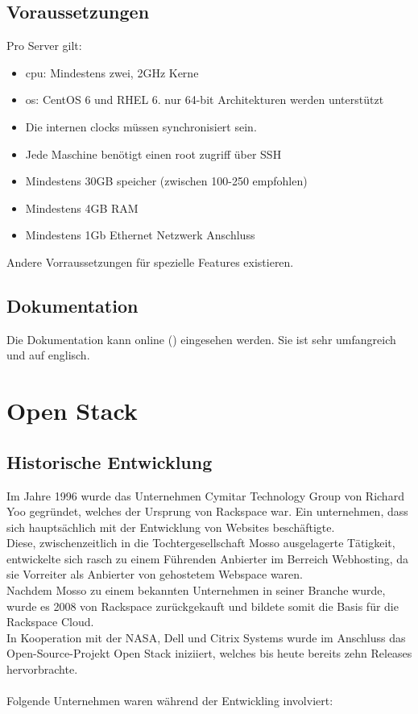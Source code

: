 \documentclass[a4paper,nochapterprefix,english,12pt]{scrreprt}
\begin{document}
\section{Voraussetzungen}
Pro Server gilt:
\begin{itemize}
\item \gls{cpu}: Mindestens zwei, 2GHz Kerne
\item \gls{os}:  CentOS 6 und RHEL 6. nur 64-bit Architekturen werden unterstützt
\item Die internen clocks müssen synchronisiert sein.
\item Jede Maschine benötigt einen root zugriff über SSH
\item Mindestens 30GB speicher (zwischen 100-250 empfohlen)
\item Mindestens 4GB RAM
\item Mindestens 1Gb Ethernet Netzwerk Anschluss
\end{itemize}
Andere Vorraussetzungen für spezielle Features existieren. \cite{EucalyptusRequ}
\section{Dokumentation}
Die Dokumentation kann online (\cite{EucalyptusDoc}) eingesehen werden.
Sie ist sehr umfangreich und auf englisch.


\chapter{Open Stack} \thispagestyle{fancy}
\section{Historische Entwicklung}
Im Jahre 1996 wurde das Unternehmen Cymitar Technology Group von Richard Yoo gegründet, welches der Ursprung von Rackspace war.
Ein unternehmen, dass sich hauptsächlich mit der Entwicklung von Websites beschäftigte.\\
Diese, zwischenzeitlich in die Tochtergesellschaft Mosso ausgelagerte Tätigkeit, entwickelte sich rasch zu einem Führenden Anbierter im Berreich Webhosting, da sie Vorreiter als Anbierter von gehostetem Webspace waren.\\
Nachdem Mosso zu einem bekannten Unternehmen in seiner Branche wurde, wurde es 2008 von Rackspace zurückgekauft und bildete somit die Basis für die Rackspace Cloud.\\
In Kooperation mit der NASA, Dell und Citrix Systems wurde im Anschluss das Open-Source-Projekt Open Stack iniziiert, welches bis heute bereits zehn Releases hervorbrachte.\\
\\
Folgende Unternehmen waren während der Entwickling involviert:
\end{document}
